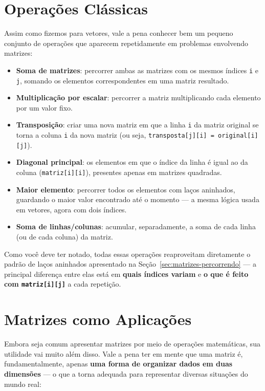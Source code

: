 \documentclass[12pt,a4paper,oneside]{extreport}
\begin{document}
\section{Operações Clássicas}
\label{sec:matrizes-operacoes}

Assim como fizemos para vetores, vale a pena conhecer bem um pequeno conjunto de operações que aparecem repetidamente em problemas envolvendo matrizes:

\begin{itemize}
    \item \textbf{Soma de matrizes}: percorrer ambas as matrizes com os mesmos índices \texttt{i} e \texttt{j}, somando os elementos correspondentes em uma matriz resultado.
    \item \textbf{Multiplicação por escalar}: percorrer a matriz multiplicando cada elemento por um valor fixo.
    \item \textbf{Transposição}: criar uma nova matriz em que a linha \texttt{i} da matriz original se torna a coluna \texttt{i} da nova matriz (ou seja, \texttt{transposta[j][i] = original[i][j]}).
    \item \textbf{Diagonal principal}: os elementos em que o índice da linha é igual ao da coluna (\texttt{matriz[i][i]}), presentes apenas em matrizes quadradas.
    \item \textbf{Maior elemento}: percorrer todos os elementos com laços aninhados, guardando o maior valor encontrado até o momento — a mesma lógica usada em vetores, agora com dois índices.
    \item \textbf{Soma de linhas/colunas}: acumular, separadamente, a soma de cada linha (ou de cada coluna) da matriz.
\end{itemize}

Como você deve ter notado, todas essas operações reaproveitam diretamente o padrão de laços aninhados apresentado na Seção~\ref{sec:matrizes-percorrendo} — a principal diferença entre elas está em \textbf{quais índices variam} e \textbf{o que é feito com \texttt{matriz[i][j]}} a cada repetição.

\section{Matrizes como Aplicações}

Embora seja comum apresentar matrizes por meio de operações matemáticas, sua utilidade vai muito além disso. Vale a pena ter em mente que uma matriz é, fundamentalmente, apenas \textbf{uma forma de organizar dados em duas dimensões} — o que a torna adequada para representar diversas situações do mundo real:
\end{document}
